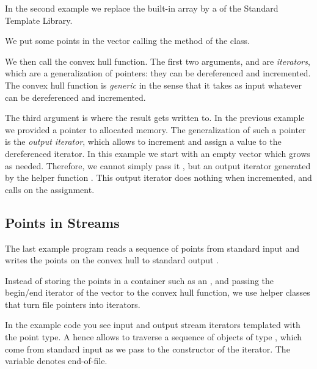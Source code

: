 In the second example we replace the built-in array
by a  of the Standard Template Library.


We put some points in the vector calling the 
method of the  class.

We then call the convex hull function. The first two arguments,
 and  are  {\em iterators}, 
which are a generalization of pointers:
they can be dereferenced and incremented. The convex hull
function is {\em generic} in the sense that it takes as
input whatever can be dereferenced and incremented.

The third argument is where the result gets written to.
In the previous example we provided a pointer to allocated memory.
The generalization of such a pointer is the {\em output iterator},
which allows to increment and assign a value to the dereferenced iterator.
In this example we start with an empty vector which grows as needed. 
Therefore, we cannot simply pass it , but
an output iterator generated by the helper function .
This output iterator does nothing when incremented,
and calls  on the assignment.



\subsection{Points in Streams}

The last example program reads a sequence of points from standard
input  and writes the points on the convex hull to
standard output .

Instead of storing the points in a container such as an
, and passing the begin/end iterator of the vector to
the convex hull function, we use helper classes that turn file
pointers into iterators.



In the example code you see input and output stream iterators
templated with the point type.  A 
hence allows to traverse a sequence of objects of type , which 
come from standard input as we pass  to the
constructor of the iterator. The variable  denotes
end-of-file.

